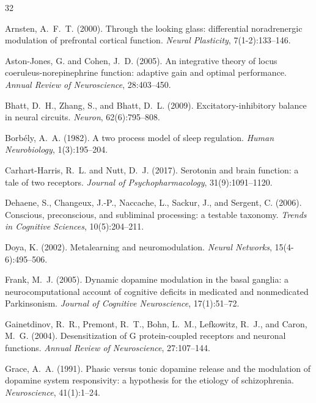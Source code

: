\documentclass[11pt,a4paper]{article}
\begin{document}

\begin{thebibliography}{32}

Arnsten, A.~F.~T. (2000).
\newblock Through the looking glass: differential noradrenergic modulation of prefrontal cortical function.
\newblock \emph{Neural Plasticity}, 7(1-2):133--146.

Aston-Jones, G. and Cohen, J.~D. (2005).
\newblock An integrative theory of locus coeruleus-norepinephrine function: adaptive gain and optimal performance.
\newblock \emph{Annual Review of Neuroscience}, 28:403--450.

Bhatt, D.~H., Zhang, S., and Bhatt, D.~L. (2009).
\newblock Excitatory-inhibitory balance in neural circuits.
\newblock \emph{Neuron}, 62(6):795--808.

Borb{\'e}ly, A.~A. (1982).
\newblock A two process model of sleep regulation.
\newblock \emph{Human Neurobiology}, 1(3):195--204.

Carhart-Harris, R.~L. and Nutt, D.~J. (2017).
\newblock Serotonin and brain function: a tale of two receptors.
\newblock \emph{Journal of Psychopharmacology}, 31(9):1091--1120.

Dehaene, S., Changeux, J.-P., Naccache, L., Sackur, J., and Sergent, C. (2006).
\newblock Conscious, preconscious, and subliminal processing: a testable taxonomy.
\newblock \emph{Trends in Cognitive Sciences}, 10(5):204--211.

Doya, K. (2002).
\newblock Metalearning and neuromodulation.
\newblock \emph{Neural Networks}, 15(4-6):495--506.

Frank, M.~J. (2005).
\newblock Dynamic dopamine modulation in the basal ganglia: a neurocomputational account of cognitive deficits in medicated and nonmedicated Parkinsonism.
\newblock \emph{Journal of Cognitive Neuroscience}, 17(1):51--72.

Gainetdinov, R.~R., Premont, R.~T., Bohn, L.~M., Lefkowitz, R.~J., and Caron, M.~G. (2004).
\newblock Desensitization of G protein-coupled receptors and neuronal functions.
\newblock \emph{Annual Review of Neuroscience}, 27:107--144.

Grace, A.~A. (1991).
\newblock Phasic versus tonic dopamine release and the modulation of dopamine system responsivity: a hypothesis for the etiology of schizophrenia.
\newblock \emph{Neuroscience}, 41(1):1--24.


\end{thebibliography}
\end{document}
